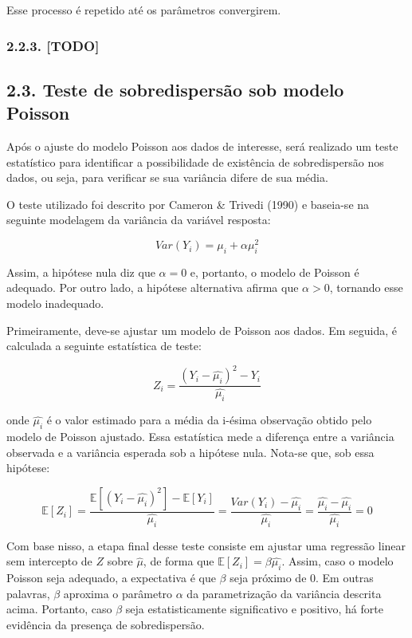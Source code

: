 \documentclass[
]{article}
\begin{document}
Esse processo é repetido até os parâmetros convergirem.

\subsubsection{2.2.3. {[}TODO{]}}\label{todo}

\subsection{2.3. Teste de sobredispersão sob modelo
Poisson}\label{teste-de-sobredispersuxe3o-sob-modelo-poisson}

Após o ajuste do modelo Poisson aos dados de interesse, será realizado
um teste estatístico para identificar a possibilidade de existência de
sobredispersão nos dados, ou seja, para verificar se sua variância
difere de sua média.

O teste utilizado foi descrito por Cameron \& Trivedi (1990) e baseia-se
na seguinte modelagem da variância da variável resposta:

\[
Var(Y_i) = \mu_i + \alpha \mu_i^2
\]

Assim, a hipótese nula diz que \(\alpha = 0\) e, portanto, o modelo de
Poisson é adequado. Por outro lado, a hipótese alternativa afirma que
\(\alpha > 0\), tornando esse modelo inadequado.

Primeiramente, deve-se ajustar um modelo de Poisson aos dados. Em
seguida, é calculada a seguinte estatística de teste:

\[
Z_i = \dfrac{(Y_i - \hat{\mu_i})^2 - Y_i}{\hat{\mu_i}}
\]

onde \(\hat{\mu_i}\) é o valor estimado para a média da i-ésima
observação obtido pelo modelo de Poisson ajustado. Essa estatística mede
a diferença entre a variância observada e a variância esperada sob a
hipótese nula. Nota-se que, sob essa hipótese:

\[
\mathbb{E}[Z_i] = \dfrac{\mathbb{E}[(Y_i - \hat{\mu_i})^2] - \mathbb{E}[Y_i]}{\hat{\mu_i}} = \dfrac{Var(Y_i) - \hat{\mu_i}}{\hat{\mu_i}} = \dfrac{\hat{\mu_i} - \hat{\mu_i}}{\hat{\mu_i}} = 0
\]

Com base nisso, a etapa final desse teste consiste em ajustar uma
regressão linear sem intercepto de \(Z\) sobre \(\hat{\mu}\), de forma
que \(\mathbb{E}[Z_i] = \beta \hat{\mu_i}\). Assim, caso o modelo
Poisson seja adequado, a expectativa é que \(\beta\) seja próximo de
\(0\). Em outras palavras, \(\beta\) aproxima o parâmetro \(\alpha\) da
parametrização da variância descrita acima. Portanto, caso \(\beta\)
seja estatisticamente significativo e positivo, há forte evidência da
presença de sobredispersão.
\end{document}
